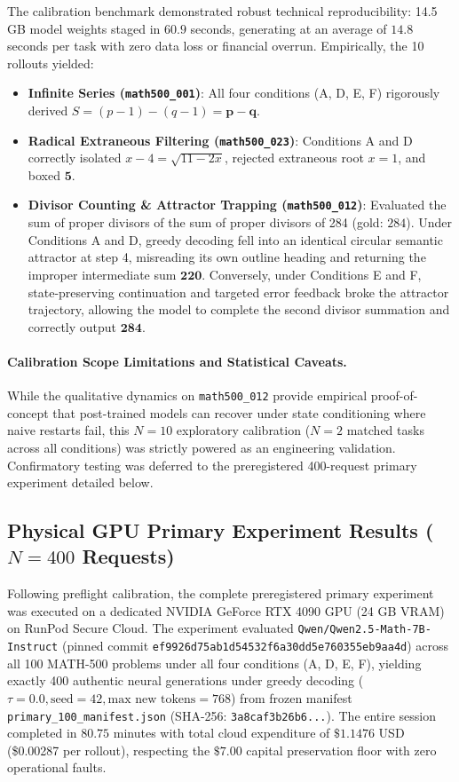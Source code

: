 \documentclass[11pt]{article}
\begin{document}
The calibration benchmark demonstrated robust technical reproducibility: 14.5 GB model weights staged in $60.9$ seconds, generating at an average of $14.8$ seconds per task with zero data loss or financial overrun. Empirically, the 10 rollouts yielded:
\begin{itemize}
    \item \textbf{Infinite Series (\texttt{math500\_001})}: All four conditions (A, D, E, F) rigorously derived $S = (p - 1) - (q - 1) = \mathbf{p - q}$.
    \item \textbf{Radical Extraneous Filtering (\texttt{math500\_023})}: Conditions A and D correctly isolated $x - 4 = \sqrt{11 - 2x}$, rejected extraneous root $x = 1$, and boxed $\mathbf{5}$.
    \item \textbf{Divisor Counting \& Attractor Trapping (\texttt{math500\_012})}: Evaluated the sum of proper divisors of the sum of proper divisors of 284 (gold: $284$). Under Conditions A and D, greedy decoding fell into an identical circular semantic attractor at step 4, misreading its own outline heading and returning the improper intermediate sum $\mathbf{220}$. Conversely, under Conditions E and F, state-preserving continuation and targeted error feedback broke the attractor trajectory, allowing the model to complete the second divisor summation and correctly output $\mathbf{284}$.
\end{itemize}

\paragraph{Calibration Scope Limitations and Statistical Caveats.}
While the qualitative dynamics on \texttt{math500\_012} provide empirical proof-of-concept that post-trained models can recover under state conditioning where naive restarts fail, this $N=10$ exploratory calibration ($N=2$ matched tasks across all conditions) was strictly powered as an engineering validation. Confirmatory testing was deferred to the preregistered 400-request primary experiment detailed below.

\subsection{Physical GPU Primary Experiment Results ($N = 400$ Requests)}
\label{sec:primary_400_results}
Following preflight calibration, the complete preregistered primary experiment was executed on a dedicated NVIDIA GeForce RTX 4090 GPU (24 GB VRAM) on RunPod Secure Cloud. The experiment evaluated \texttt{Qwen/Qwen2.5-Math-7B-Instruct} (pinned commit \texttt{ef9926d75ab1d54532f6a30dd5e760355eb9aa4d}) across all 100 MATH-500 problems under all four conditions (A, D, E, F), yielding exactly 400 authentic neural generations under greedy decoding ($\tau = 0.0, \text{seed} = 42, \text{max new tokens} = 768$) from frozen manifest \texttt{primary\_100\_manifest.json} (SHA-256: \texttt{3a8caf3b26b6...}). The entire session completed in $80.75$ minutes with total cloud expenditure of $\$1.1476$ USD (\$0.00287 per rollout), respecting the $\$7.00$ capital preservation floor with zero operational faults.
\end{document}

